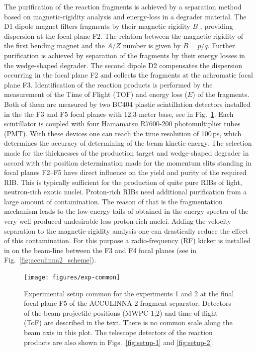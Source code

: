 The purification of the reaction fragments is achieved by a separation method based on magnetic-rigidity analysis and energy-loss in a degrader material. 
The D1 dipole magnet filters fragments by their magnetic rigidity $B$ , providing dispersion at the focal plane F2. 
The relation between the magnetic rigidity of the first bending magnet and the $A/Z$ number is given by $B=p/q$. 
Further purification is achieved by separation of the fragments by their energy losses in the wedge-shaped degrader. 
The second dipole D2 compensates the dispersion occurring in the focal plane F2 and collects the fragments at the achromatic focal plane F3. 
Identification of the reaction products is performed by the measurement of the Time of Flight (TOF) and energy
loss ($E$) of the fragments.
Both of them are measured by two BC404 plastic scintillation detectors installed in the the F3 and F5 focal planes with 12.3-meter base, see in Fig.\ \ref{fig:exp-common}.
Each scintillator is coupled with four Hamamatsu R7600-200 photomultiplier tubes (PMT). 
With these devices one can reach the time resolution of 100\,ps, which determines the accuracy of determining of the beam kinetic energy.
The selection made for the thicknesses of the production target and wedge-shaped degrader in accord with the position determination made for the momentum slits standing in focal planes F2–F5 have direct influence on the yield and purity of the required RIB.
This is typically sufficient for the production of quite pure RIBs of light, neutron-rich exotic nuclei. Proton-rich RIBs need additional purification from a large amount of contamination. 
The reason of that is the fragmentation mechanism leads to the low-energy tails of obtained in the energy spectra of the very well-produced undesirable less proton-rich nuclei. 
Adding the velocity separation to the magnetic-rigidity analysis one can drastically reduce the effect of this contamination. 
For this purpose a radio-frequency (RF) kicker is installed in on the beam-line between the F3 and F4 focal planes (see in Fig.\ \ref{fig:acculinna2_scheme}). 

\begin{figure}
	\begin{center}
		\texttt{[image: figures/exp-common]}
	\end{center}
	\caption{
		Experimental setup common for the experiments 1 and 2 at the final focal plane F5 of the ACCULINNA-2 fragment separator.
		Detectors of the beam projectile positions (MWPC-1,2) and time-of-flight (ToF) are described in the text.
		There is no common scale along the beam axis in this plot.	
		The telescope detectors of the reaction products are also shown in Figs.\ \ref{fig:setup-1} and \ref{fig:setup-2}.
	}
	\label{fig:exp-common}
\end{figure}


